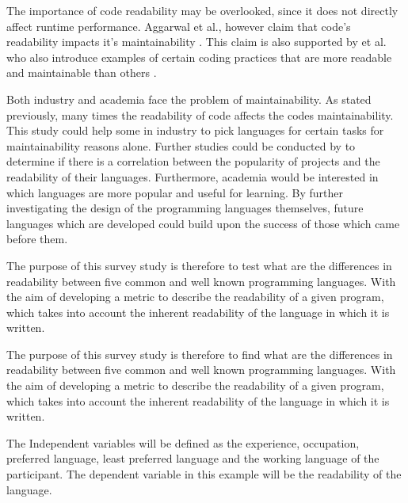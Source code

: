 \documentclass[times, 10pt,twocolumn]{IEEEtran}
\begin{document}
The importance of code readability may be overlooked, since it does not directly affect runtime performance. Aggarwal et al., however claim that code's readability impacts it's maintainability \cite{aggarwal2002integrated}. This claim is also supported by \cite{elshoff1982improving} et al. who also introduce examples of certain coding practices that are more readable and maintainable than others \cite{elshoff1982improving}.




Both industry and academia face the problem of maintainability. As stated previously, many times the readability of code affects the codes maintainability. This study could help some in industry to pick languages for certain tasks for maintainability reasons alone. Further studies could be conducted by to determine if there is a correlation between the popularity of projects and the readability of their languages. Furthermore, academia would be interested in which languages are more popular and useful for learning. By further investigating the design of the programming languages themselves, future languages which are developed could build upon the success of those which came before them.
\newline


The purpose of this survey study is therefore to test what are the differences in readability between five common and well known programming languages. With the aim of developing a metric to describe the readability of a given program, which takes into account the inherent readability of the language in which it is written.

The purpose of this survey study is therefore to find what are the differences in readability between five common and well known programming languages. With the aim of developing a metric to describe the readability of a given program, which takes into account the inherent readability of the language in which it is written.

\newline

The Independent variables will be defined as the experience, occupation, preferred language, least preferred language and the working language of the participant. The dependent variable in this example will be the readability of the language.
\newline
\end{document}
